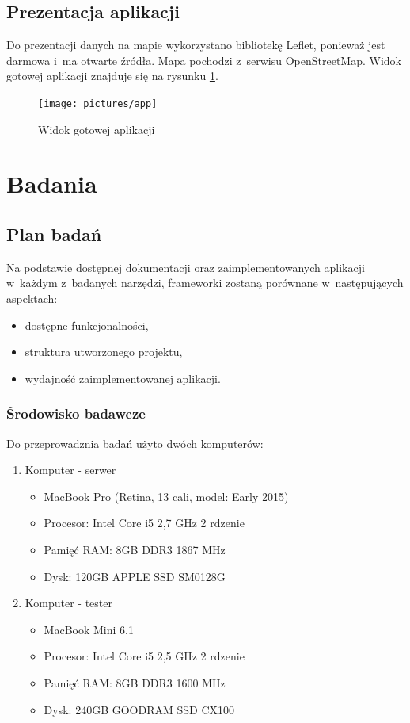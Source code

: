 \documentclass[printmode]{mgr}
\begin{document}
\section{Prezentacja aplikacji}

Do prezentacji danych na mapie wykorzystano bibliotekę Leflet, ponieważ jest darmowa i~ma otwarte źródła. Mapa pochodzi z~serwisu OpenStreetMap. Widok gotowej aplikacji znajduje się na rysunku \ref{fig:app}.

\begin{figure}[H]
  \centering
  \texttt{[image: pictures/app]}
  \caption{Widok gotowej aplikacji}
  \label{fig:app}
\end{figure}

\chapter{Badania}

\section{Plan badań}

Na podstawie dostępnej dokumentacji oraz zaimplementowanych aplikacji w~każdym z~badanych narzędzi, frameworki zostaną porównane w~następujących aspektach:
\begin{itemize}
  \item dostępne funkcjonalności,
  \item struktura utworzonego projektu,
  \item wydajność zaimplementowanej aplikacji.
\end{itemize}

\subsection{Środowisko badawcze}

Do przeprowadznia badań użyto dwóch komputerów:

\begin{enumerate}
\item Komputer - serwer
  \begin{itemize}
    \item MacBook Pro (Retina, 13 cali, model: Early 2015)
    \item Procesor: Intel Core i5 2,7 GHz 2 rdzenie
    \item Pamięć RAM: 8GB DDR3 1867 MHz
    \item Dysk: 120GB APPLE SSD SM0128G
  \end{itemize}
\item Komputer - tester
  \begin{itemize}
    \item MacBook Mini 6.1
    \item Procesor: Intel Core i5 2,5 GHz 2 rdzenie
    \item Pamięć RAM: 8GB DDR3 1600 MHz
    \item Dysk: 240GB GOODRAM SSD CX100
  \end{itemize}
\end{enumerate}
\end{document}
